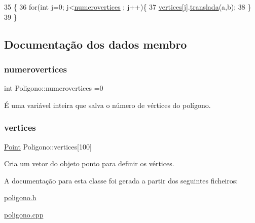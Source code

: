 \begin{DoxyCode}
35 \{
36     \textcolor{keywordflow}{for}(\textcolor{keywordtype}{int} j=0; j<\mbox{\hyperlink{class_poligono_adc59c72d363089aa8dc097e1f338875a}{numerovertices}} ; j++)\{
37         \mbox{\hyperlink{class_poligono_a18179d267bdf366f6bb00a4e1b16f1d7}{vertices}}[j].\mbox{\hyperlink{class_point_ad9676e36f3444534b609e3c68422239a}{translada}}(a,b);
38     \}
39 \}
\end{DoxyCode}


\subsection{Documentação dos dados membro}
\mbox{\label{class_poligono_adc59c72d363089aa8dc097e1f338875a}} 
\subsubsection{\texorpdfstring{numerovertices}{numerovertices}}
{\footnotesize\ttfamily int Poligono\+::numerovertices =0\hspace{0.3cm}{\ttfamily [protected]}}



É uma variável inteira que salva o número de vértices do polígono. 

\mbox{\label{class_poligono_a18179d267bdf366f6bb00a4e1b16f1d7}} 
\subsubsection{\texorpdfstring{vertices}{vertices}}
{\footnotesize\ttfamily \mbox{\hyperlink{class_point}{Point}} Poligono\+::vertices\mbox{[}100\mbox{]}\hspace{0.3cm}{\ttfamily [protected]}}



Cria um vetor do objeto ponto para definir os vértices. 



A documentação para esta classe foi gerada a partir dos seguintes ficheiros\+:\begin{DoxyCompactItemize}
\item 
\mbox{\hyperlink{poligono_8h}{poligono.\+h}}\item 
\mbox{\hyperlink{poligono_8cpp}{poligono.\+cpp}}\end{DoxyCompactItemize}
